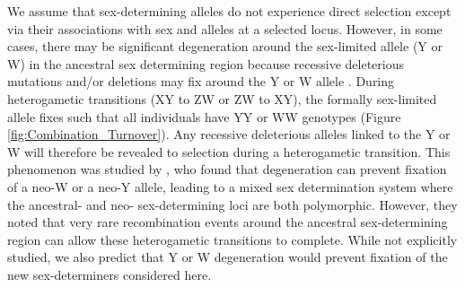 \documentclass[12pt]{article}
\begin{document}

We assume that sex-determining alleles do not experience direct selection except via their associations with sex and alleles at a selected locus. 
However, in some cases, there may be significant degeneration around the sex-limited allele (Y or W) in the ancestral sex determining region because recessive deleterious mutations and/or deletions may fix around the Y or W allele \citep{Rice:1996ke,Charlesworth:2000cc,Bachtrog:2006ed,Marais:2008hm}. 
During heterogametic transitions (XY to ZW or ZW to XY), the formally sex-limited allele fixes such that all individuals have YY or WW genotypes (Figure \ref{fig:Combination_Turnover}). 
Any recessive deleterious alleles linked to the Y or W will therefore be revealed to selection during a heterogametic transition. 
This phenomenon was studied by \citet{vanDoorn:2010hu}, who found that degeneration can prevent fixation of a neo-W or a neo-Y allele, leading to a mixed sex determination system where the ancestral- and neo- sex-determining loci are both polymorphic. 
However, they noted that very rare recombination events around the ancestral sex-determining region can allow these heterogametic transitions to complete.  
While not explicitly studied, we also predict that Y or W degeneration would prevent fixation of the new sex-determiners considered here.
\end{document}
